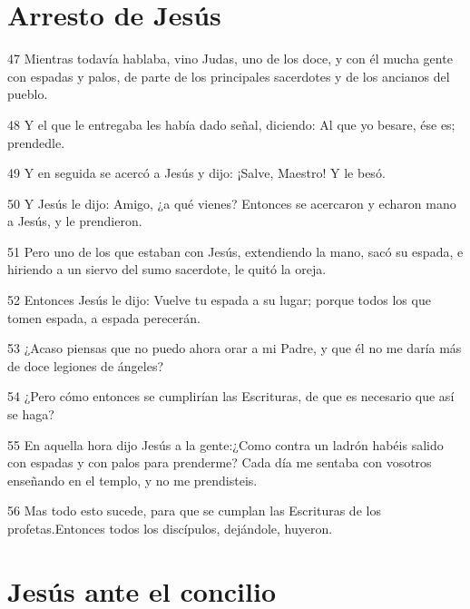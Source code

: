 \section*{Arresto de Jesús}

\par 47 Mientras todavía hablaba, vino Judas, uno de los doce, y con él mucha gente con espadas y palos, de parte de los principales sacerdotes y de los ancianos del pueblo.
\par 48 Y el que le entregaba les había dado señal, diciendo: Al que yo besare, ése es; prendedle.
\par 49 Y en seguida se acercó a Jesús y dijo: ¡Salve, Maestro! Y le besó.
\par 50 Y Jesús le dijo: Amigo, ¿a qué vienes? Entonces se acercaron y echaron mano a Jesús, y le prendieron.
\par 51 Pero uno de los que estaban con Jesús, extendiendo la mano, sacó su espada, e hiriendo a un siervo del sumo sacerdote, le quitó la oreja.
\par 52 Entonces Jesús le dijo: Vuelve tu espada a su lugar; porque todos los que tomen espada, a espada perecerán.
\par 53 ¿Acaso piensas que no puedo ahora orar a mi Padre, y que él no me daría más de doce legiones de ángeles?
\par 54 ¿Pero cómo entonces se cumplirían las Escrituras, de que es necesario que así se haga?
\par 55 En aquella hora dijo Jesús a la gente:¿Como contra un ladrón habéis salido con espadas y con palos para prenderme? Cada día me sentaba con vosotros enseñando en el templo, y no me prendisteis.
\par 56 Mas todo esto sucede, para que se cumplan las Escrituras de los profetas.Entonces todos los discípulos, dejándole, huyeron.

\section*{Jesús ante el concilio}

